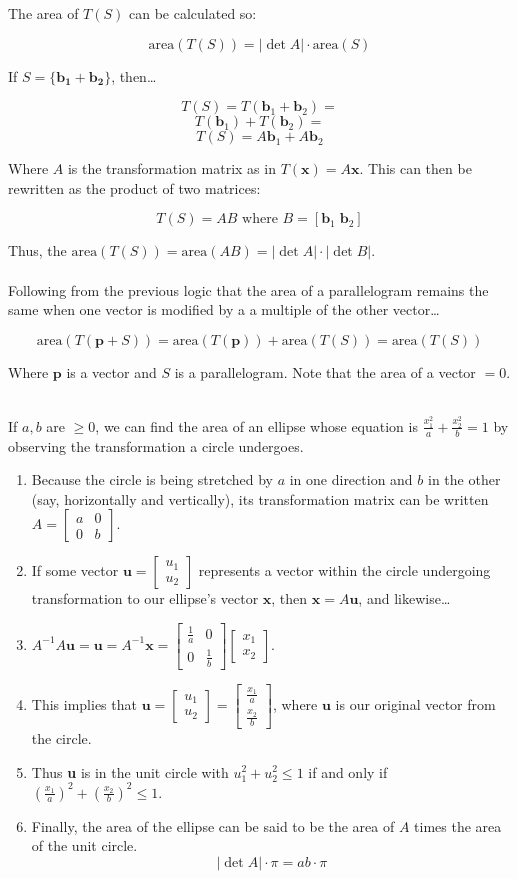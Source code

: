 \documentclass[12pt]{article}
\newcommand{\bt}[1]{\textbf{{#1}}}
\newcommand{\bm}[1]{\mathbf{{#1}}}
\newcommand{\mb}{\begin{bmatrix}}
\newcommand{\me}{\end{bmatrix}}
\newcommand{\area}[1]{\textrm{area$({#1})$}}
\begin{document}
The area of $T(S)$ can be calculated so:

$$\area{T(S)} = |\det A| \cdot \area{S}$$ 

If $S = \{ \bm{b_1} + \bm{b_2} \}$, then\dots

$$T(S) = T(\bm{b}_1 + \bm{b}_2) = $$
$$T(\bm{b}_1) + T(\bm{b}_2) = $$
$$T(S) = A\bm{b}_1 + A\bm{b}_2$$

Where $A$ is the transformation matrix as in $T(\bm{x}) = A\bm{x}$. This can then be rewritten as the product of two matrices:

$$T(S) = AB \textrm{ where } B = [\bm{b}_1 \; \bm{b}_2]$$

Thus, the $\area{T(S)} = \area{AB} = |\det A| \cdot |\det B|$. \\ \\

Following from the previous logic that the area of a parallelogram remains the same when one vector is modified by a a multiple of the other vector\dots

$$\area{T(\bm{p} + S)} = \area{T(\bm{p})} + \area{T(S)} = \area{T(S)}$$

Where $\bm{p}$ is a vector and $S$ is a parallelogram. Note that the area of a vector $= 0$. \\ \\

\iffalse

If $a, b$ are $\geq 0$, we can find the area of an ellipse whose equation is $\frac{x^2_1}{a} + \frac{x^2_2}{b} = 1$ by observing the
transformation a circle undergoes.

\begin{enumerate}
    \item Because the circle is being stretched by $a$ in one direction and $b$ in the other (say, horizontally and vertically), its transformation matrix
    can be written $A = \mb a & 0 \\ 0 & b \me$.
    \item If some vector $\bm{u} = \mb u_1 \\ u_2 \me$ represents a vector within the circle undergoing transformation to our ellipse's
    vector $\bm{x}$, then $\bm{x} = A\bm{u}$, and likewise\dots
    \item $A^{-1}A\bm{u} = \bm{u} = A^{-1}\bm{x} = \mb \frac{1}{a} & 0 \\ 0 & \frac{1}{b} \me \mb x_1 \\ x_2 \me$.
    \item This implies that $\bm{u} = \mb u_1 \\ u_2 \me = \mb \frac{x_1}{a} \\ \frac{x_2}{b} \me$, where $\bm{u}$ is our original vector from the circle.
    \item Thus \bt{u} is in the unit circle with $u^2_1 + u^2_2 \leq 1$ if and only if $(\frac{x_1}{a})^2 + (\frac{x_2}{b})^2 \leq 1$.
    \item Finally, the area of the ellipse can be said to be the area of $A$ times the area of the unit circle.
    $$|\det A| \cdot \pi = ab \cdot \pi$$
\end{enumerate}
\end{document}
